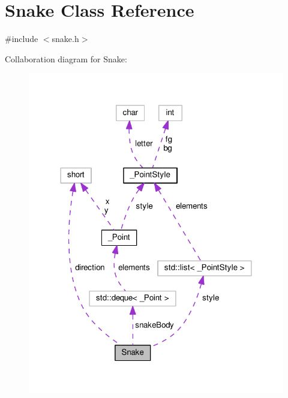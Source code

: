 \hypertarget{class_snake}{\section{Snake Class Reference}
\label{class_snake}
}


{\ttfamily \#include $<$snake.\-h$>$}



Collaboration diagram for Snake\-:
\nopagebreak
\begin{figure}[H]
\begin{center}
\leavevmode
\includegraphics[width=318pt]{class_snake__coll__graph}
\end{center}
\end{figure}
